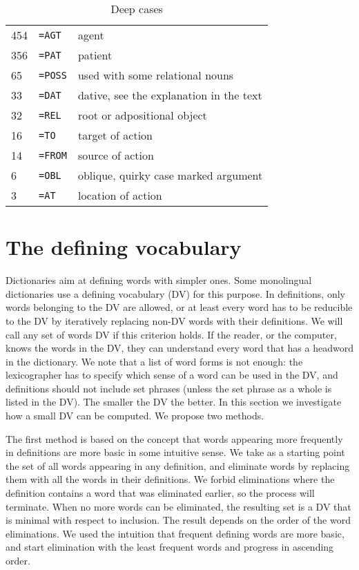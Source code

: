 \documentclass[a4paper,10pt]{article}
\begin{document}
\begin{table}
\begin{center}
\begin{tabular}{lll}
\\ 454	& \texttt{=AGT}	& agent
\\ 356	& \texttt{=PAT}	& patient
\\ 65	& \texttt{=POSS}& used with some relational nouns %
\\ 33	& \texttt{=DAT}	& dative, see the explanation in the text
\\ 32	& \texttt{=REL} & root or adpositional object
\\ 16	& \texttt{=TO}	& target of action %
\\ 14	& \texttt{=FROM}& source of action
\\ 6	& \texttt{=OBL} & oblique, quirky case marked argument
\\ 3	& \texttt{=AT}	& location of action
\end{tabular}

\end{center}
\caption{Deep cases}
\label{table_deep}
\end{table}
\section{The defining vocabulary}\label{sec_dv}%
Dictionaries aim at defining words with simpler ones. Some monolingual
dictionaries use a defining vocabulary (DV) for this purpose. In definitions,
only words belonging to the DV are allowed, or at least every word has to be
reducible to the DV by iteratively replacing non-DV words with their
definitions. We will call any set of words DV if this criterion holds.  If the
reader, or the computer, knows the words in the DV, they can understand every
word that has a headword in the dictionary.  We note that a list of word forms
is not enough: the lexicographer has to specify which sense of a word can be
used in the DV, and definitions should not include set phrases (unless the set
phrase as a whole is listed in the DV). The smaller the DV the better. In this
section we investigate how a small DV can be computed. We propose two methods.

The first method is based on the concept that words appearing more frequently
in definitions are more basic in some intuitive sense. We take as a starting
point the set of all words appearing in any definition, and eliminate words by
replacing them with all the words in their definitions. We forbid eliminations
where the definition contains a word that was eliminated earlier, so the
process will terminate. When no more words can be eliminated, the resulting
set is a DV that is minimal with respect to inclusion. The result depends on
the order of the word eliminations. We used the intuition that frequent
defining words are more basic, and start elimination with the least frequent
words and progress in ascending order.
\end{document}
